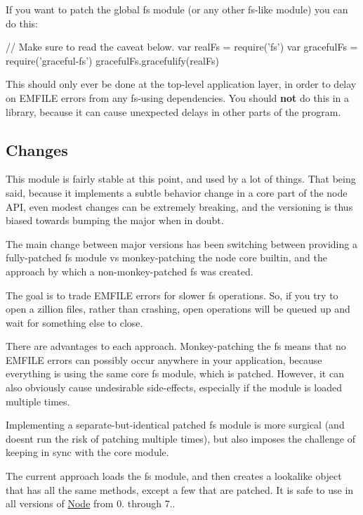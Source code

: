 If you want to patch the global fs module (or any other fs-\/like module) you can do this\+:


\begin{DoxyCode}
// Make sure to read the caveat below.
var realFs = require('fs')
var gracefulFs = require('graceful-fs')
gracefulFs.gracefulify(realFs)
\end{DoxyCode}


This should only ever be done at the top-\/level application layer, in order to delay on E\+M\+F\+I\+LE errors from any fs-\/using dependencies. You should {\bfseries not} do this in a library, because it can cause unexpected delays in other parts of the program.

\subsection*{Changes}

This module is fairly stable at this point, and used by a lot of things. That being said, because it implements a subtle behavior change in a core part of the node A\+PI, even modest changes can be extremely breaking, and the versioning is thus biased towards bumping the major when in doubt.

The main change between major versions has been switching between providing a fully-\/patched {\ttfamily fs} module vs monkey-\/patching the node core builtin, and the approach by which a non-\/monkey-\/patched {\ttfamily fs} was created.

The goal is to trade {\ttfamily E\+M\+F\+I\+LE} errors for slower fs operations. So, if you try to open a zillion files, rather than crashing, {\ttfamily open} operations will be queued up and wait for something else to {\ttfamily close}.

There are advantages to each approach. Monkey-\/patching the fs means that no {\ttfamily E\+M\+F\+I\+LE} errors can possibly occur anywhere in your application, because everything is using the same core {\ttfamily fs} module, which is patched. However, it can also obviously cause undesirable side-\/effects, especially if the module is loaded multiple times.

Implementing a separate-\/but-\/identical patched {\ttfamily fs} module is more surgical (and doesn\textquotesingle{}t run the risk of patching multiple times), but also imposes the challenge of keeping in sync with the core module.

The current approach loads the {\ttfamily fs} module, and then creates a lookalike object that has all the same methods, except a few that are patched. It is safe to use in all versions of \mbox{\hyperlink{classNode}{Node}} from 0. through 7..

